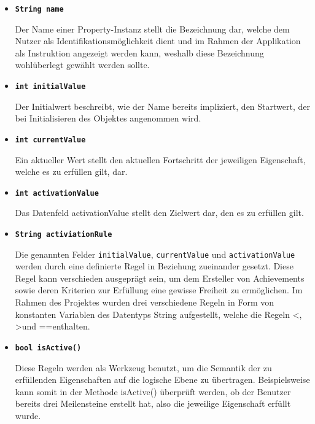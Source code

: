 \documentclass[bibliography=totoc,listof=totoc,BCOR=5mm,DIV=12,oneside]{scrbook}
\begin{document}
\begin{itemize}
\item[] \texttt{\textbf{String name}}
\par Der Name einer Property-Instanz stellt die Bezeichnung dar, welche dem Nutzer als Identifikationsmöglichkeit dient und im Rahmen der Applikation als Instruktion angezeigt werden kann, weshalb diese Bezeichnung wohlüberlegt gewählt werden sollte. 

\item[] \texttt{\textbf{int initialValue}}
\par Der Initialwert beschreibt, wie der Name bereits impliziert, den Startwert, der bei Initialisieren des Objektes angenommen wird.

\item[] \texttt{\textbf{int currentValue}}
\par Ein aktueller Wert stellt den aktuellen Fortschritt der jeweiligen Eigenschaft, welche es zu erfüllen gilt, dar. 

\item[] \texttt{\textbf{int activationValue}}
\par Das Datenfeld activationValue stellt den Zielwert dar, den es zu erfüllen gilt.

\item[] \texttt{\textbf{String activiationRule}}
\par Die genannten Felder \texttt{initialValue}, \texttt{currentValue} und \texttt{activationValue} werden durch eine definierte Regel in Beziehung zueinander gesetzt. Diese Regel kann verschieden ausgeprägt sein, um dem Ersteller von Achievements sowie deren Kriterien zur Erfüllung eine gewisse Freiheit zu ermöglichen. Im Rahmen des Projektes wurden drei verschiedene Regeln in Form von konstanten Variablen des Datentyps String aufgestellt, welche die Regeln \grqq <\grqq, \grqq >\grqq und \grqq ==\grqq enthalten. 

\item[] \texttt{\textbf{bool isActive()}}
\par Diese Regeln werden als Werkzeug benutzt, um die Semantik der zu erfüllenden Eigenschaften auf die logische Ebene zu übertragen.
Beispielsweise kann somit in der Methode isActive() überprüft werden, ob der Benutzer bereits drei Meilensteine erstellt hat, also die jeweilige Eigenschaft erfüllt wurde.

\end{itemize}
\end{document}
